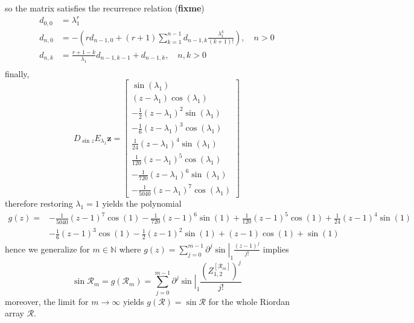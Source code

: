 so the matrix satisfies the recurrence relation (\textbf{fixme})
\begin{displaymath}
\begin{split}
d_{0,0}&=\lambda_{1}^{r}\\
d_{n,0}&=-\left(r d_{n-1, 0} + (r+1)\sum_{k=1}^{n-1}{d_{n-1, k}\frac{\lambda_{1}^{k}}{(k+1)!}}\right), \quad n>0 \\
d_{n,k}&=\frac{r+1-k}{\lambda_{1}}d_{n-1, k-1} + d_{n-1,k}, \quad n,k > 0\\
\end{split}
\end{displaymath}
finally,
\begin{displaymath}
D_{\sin{z}}E_{\lambda_{1}}\boldsymbol{z} = \left[\begin{matrix}\sin{\left (\lambda_{1} \right )}\\\left(z - \lambda_{1}\right) \cos{\left (\lambda_{1} \right )}\\- \frac{1}{2} \left(z - \lambda_{1}\right)^{2} \sin{\left (\lambda_{1} \right )}\\- \frac{1}{6} \left(z - \lambda_{1}\right)^{3} \cos{\left (\lambda_{1} \right )}\\\frac{1}{24} \left(z - \lambda_{1}\right)^{4} \sin{\left (\lambda_{1} \right )}\\\frac{1}{120} \left(z - \lambda_{1}\right)^{5} \cos{\left (\lambda_{1} \right )}\\- \frac{1}{720} \left(z - \lambda_{1}\right)^{6} \sin{\left (\lambda_{1} \right )}\\- \frac{1}{5040} \left(z - \lambda_{1}\right)^{7} \cos{\left (\lambda_{1} \right )}\end{matrix}\right]
\end{displaymath}
therefore restoring $\lambda_{1}=1$ yields the polynomial
\begin{displaymath}
\begin{split}
g{\left (z \right )} = &- \frac{1}{5040} \left(z - 1\right)^{7} \cos{\left (1 \right )} - \frac{1}{720} \left(z - 1\right)^{6} \sin{\left (1 \right )} + \frac{1}{120} \left(z - 1\right)^{5} \cos{\left (1 \right )} + \frac{1}{24} \left(z - 1\right)^{4} \sin{\left (1 \right )} \\
                       &- \frac{1}{6} \left(z - 1\right)^{3} \cos{\left (1 \right )} - \frac{1}{2} \left(z - 1\right)^{2} \sin{\left (1 \right )} + \left(z - 1\right) \cos{\left (1 \right )} + \sin{\left (1 \right )}
\end{split}
\end{displaymath}
hence we generalize for $m\in\mathbb{N}$ where $g(z) = \sum_{j=0}^{m-1}{\left.{\partial^{j} \sin}\right|_{1} \frac{(z-1)^{j}}{j!}}$ implies
\begin{displaymath}
\sin{\mathcal{R}_{m}} = g{\left (\mathcal{R}_{m} \right )} = \sum_{j=0}^{m-1}{\left.{\partial^{j} \sin}\right|_{1} \frac{{\left(Z_{1,2}^{\left[\mathcal{R}_{m}\right]}\right)}^{j}}{j!}}
\end{displaymath}
moreover, the limit for $m \rightarrow \infty$ yields $ g{\left (\mathcal{R}
\right )} = \sin{\mathcal{R}} $ for the whole Riordan array $\mathcal{R}$.

